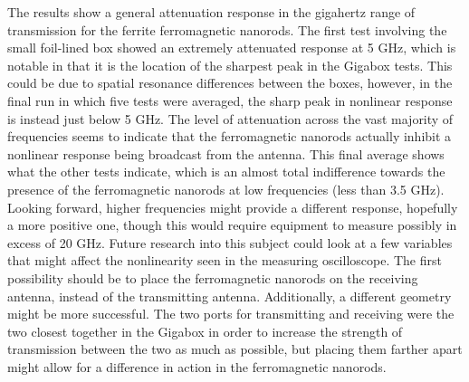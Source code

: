 The results show a general attenuation response in the gigahertz range of transmission for the ferrite ferromagnetic nanorods. The first test involving the small foil-lined box showed an extremely attenuated response at 5 GHz, which is notable in that it is the location of the sharpest peak in the Gigabox tests. This could be due to spatial resonance differences between the boxes, however, in the final run in which five tests were averaged, the sharp peak in nonlinear response is instead just below 5 GHz. The level of attenuation across the vast majority of frequencies seems to indicate that the ferromagnetic nanorods actually inhibit a nonlinear response being broadcast from the antenna. This final average shows what the other tests indicate, which is an almost total indifference towards the presence of the ferromagnetic nanorods at low frequencies (less than 3.5 GHz). Looking forward, higher frequencies might provide a different response, hopefully a more positive one, though this would require equipment to measure possibly in excess of 20 GHz.
Future research into this subject could look at a few variables that might affect the nonlinearity seen in the measuring oscilloscope. The first possibility should be to place the ferromagnetic nanorods on the receiving antenna, instead of the transmitting antenna. Additionally, a different geometry might be more successful. The two ports for transmitting and receiving were the two closest together in the Gigabox in order to increase the strength of transmission between the two as much as possible, but placing them farther apart might allow for a difference in action in the ferromagnetic nanorods.

